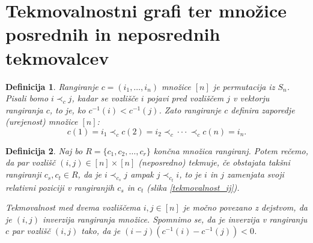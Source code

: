 \documentclass[a4paper, 12pt]{book}
\newtheorem{definicija}{Definicija}[chapter]
\begin{document}
\section{ Tekmovalnostni grafi ter množice posrednih in neposrednih tekmovalcev }

\begin{definicija}
    Rangiranje $c = (i_1, \dots, i_n)$ množice $[n]$ je permutacija iz $S_n$. Pisali bomo $i \prec_c j$, kadar se vozlišče $i$ pojavi pred vozliščem $j$ v vektorju rangiranja $c$, to je, ko $c^{-1}(i) < c^{-1}(j)$. Zato rangiranje $c$ definira zaporedje (urejenost) množice $[n]$:
    \[
        c(1) = i_1 \prec_c c(2) = i_2 \prec_c \cdot\cdot\cdot \prec_c c(n) = i_n.
    \]
\end{definicija}

\begin{definicija}
\label{def_tekmovalnosti}
    Naj bo $R = \{c_1, c_2, \dots, c_r\}$ končna množica rangiranj. Potem rečemo, da par vozlišč $(i, j) \in [n] \times [n]$ (neposredno) tekmuje, če obstajata takšni rangiranji $c_s, c_t \in R$, da je $i \prec_{c_s} j$ ampak $j \prec_{c_t} i$, to je $i$ in $j$ zamenjata svoji relativni poziciji v rangiranjih $c_s$ in $c_t$ (slika \ref{tekmovalnost_ij}).

    Tekmovalnost med dvema vozliščema $i, j \in [n]$ je močno povezano z dejstvom, da je $(i, j)$ inverzija rangiranja množice. Spomnimo se, da je inverzija v rangiranju $c$ par vozlišč $(i, j)$ tako, da je $(i-j)(c^{-1}(i) - c^{-1}(j)) < 0$.
\end{definicija}
\end{document}
